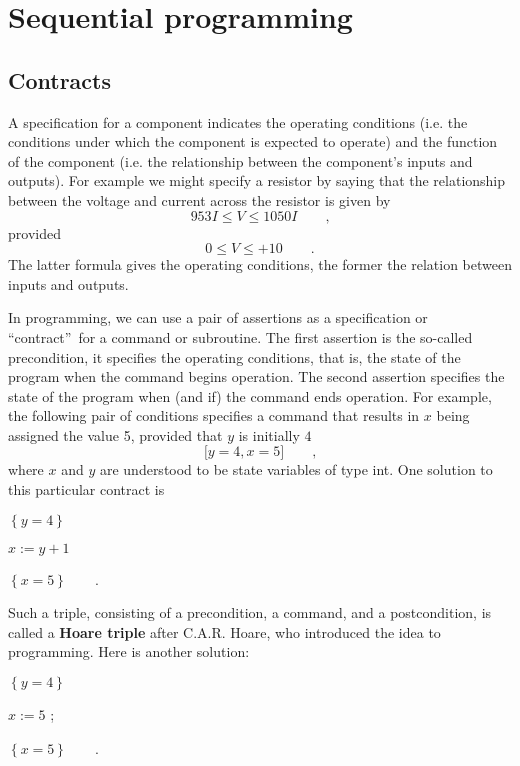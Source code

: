 \documentclass[muchmore,11pt]{article}%
\begin{document}
\section{Sequential programming\label{seq}}

\subsection{Contracts}

A specification for a component indicates the operating conditions (i.e. the
conditions under which the component is expected to operate) and the function
of the component (i.e. the relationship between the component's inputs and
outputs). For example we might specify a resistor by saying that the
relationship between the voltage and current across the resistor is given by%
\[
953I\leq V\leq1050I\qquad\text{,}%
\]
provided%
\[
0\leq V\leq+10\qquad\text{.}%
\]
The latter formula gives the operating conditions, the former the relation
between inputs and outputs.

In programming, we can use a pair of assertions as a specification or
\textquotedblleft contract\textquotedblright\ for a command or subroutine. The
first assertion is the so-called precondition, it specifies the operating
conditions, that is, the state of the program when the command begins
operation. The second assertion specifies the state of the program when (and
if) the command ends operation. For example, the following pair of conditions
specifies a command that results in $x$ being assigned the value 5, provided
that $y$ is initially $4$%
\[
\lbrack y=4,x=5]\qquad\text{,}%
\]
where $x$ and $y$ are understood to be state variables of type \textsf{int}.
One solution to this particular contract is

\begin{code}
$\left\{  y=4\right\}  $

$x:=y+1$

$\left\{  x=5\right\}  \qquad$.
\end{code}

\noindent Such a triple, consisting of a precondition, a command, and a
postcondition, is called a \textbf{Hoare triple} after C.A.R. Hoare, who
introduced the idea to programming. Here is another solution:

\begin{code}
$\left\{  y=4\right\}  $

$x:=5$ ;

$\left\{  x=5\right\}  \qquad$.
\end{code}
\end{document}
